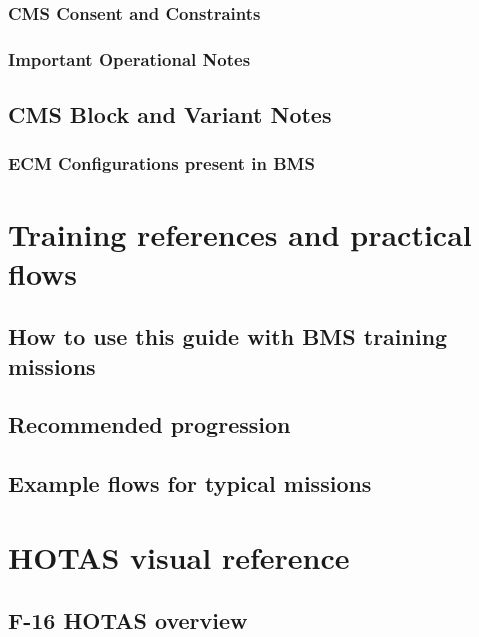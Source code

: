 \documentclass[11pt,a4paper]{article}
\begin{document}
\subsubsection{CMS Consent and Constraints}

\subsubsection{Important Operational Notes}

\subsection{CMS Block and Variant Notes}

\subsubsection{ECM Configurations present in BMS}


\section{Training references and practical flows}

\subsection{How to use this guide with BMS training missions}

\subsection{Recommended progression}

\subsection{Example flows for typical missions}


\section{HOTAS visual reference}

\subsection{F-16 HOTAS overview}
\end{document}
